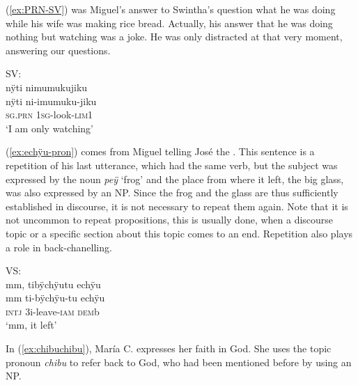 \largerpage
(\ref{ex:PRN-SV}) was Miguel’s answer to Swintha’s question what he was doing while his wife was making rice bread. Actually, his answer that he was doing nothing but watching was a joke. He was only distracted at that very moment, answering our questions. 

\ea\label{ex:PRN-SV}
\begingl
\glpreamble \textup{SV:}\\nÿti nimumukujiku\\
\gla nÿti ni-imumuku-jiku\\
\textsc{sg.prn} 1\textsc{sg}-look-\textsc{lim}1\\
\glft ‘I am only watching’
\endgl
\trailingcitation{[mxx-e120415ls.071]}
\xe


%

(\ref{ex:echÿu-pron}) comes from Miguel telling José the . This sentence is a repetition of his last utterance, which had the same verb, but the subject was expressed by the noun \textit{peÿ} ‘frog’ and the place from where it left, the big glass, was also expressed by an NP. Since the frog and the glass are thus sufficiently established in discourse, it is not necessary to repeat them again. Note that it is not uncommon to repeat propositions, this is usually done, when a discourse topic or a specific section about this topic comes to an end. Repetition also plays a role in back-chanelling.


\ea\label{ex:echÿu-pron}
\begingl 
\glpreamble \textup{VS:}\\mm, tibÿchÿutu echÿu\\
\gla mm ti-bÿchÿu-tu echÿu\\ 
\glb \textsc{intj} 3i-leave-\textsc{iam} \textsc{dem}b\\ 
\glft ‘mm, it left’
\trailingcitation{[mox-a110920l-2.026]}
\xe

In (\ref{ex:chibuchibu}), María C. expresses her faith in God. She uses the topic pronoun \textit{chibu} to refer back to God, who had been mentioned before by using an NP.

